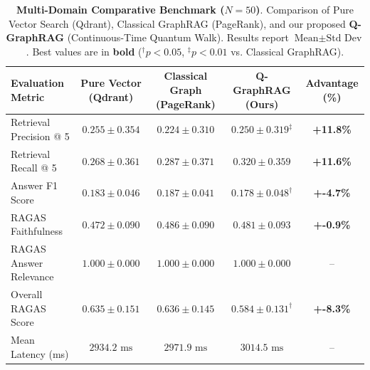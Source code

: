 \begin{table}[t]
\centering
\small
\caption{\textbf{Multi-Domain Comparative Benchmark ($N=50$)}. Comparison of Pure Vector Search (Qdrant), Classical GraphRAG (PageRank), and our proposed \textbf{Q-GraphRAG} (Continuous-Time Quantum Walk). Results report $\text{Mean} \pm \text{Std Dev}$. Best values are in \textbf{bold} ($^{\dagger}p < 0.05$, $^{\ddagger}p < 0.01$ vs. Classical GraphRAG).}
\label{tab:benchmark_50_results}
\begin{tabular}{lcccc}
\toprule
\textbf{Evaluation Metric} & \textbf{Pure Vector (Qdrant)} & \textbf{Classical Graph (PageRank)} & \textbf{Q-GraphRAG (Ours)} & \textbf{Advantage (\%)} \\
\midrule
Retrieval Precision @ 5 & $0.255 \pm 0.354$ & $0.224 \pm 0.310$ & $\mathbf{0.250 \pm 0.319}^{\ddagger}$ & \textbf{+11.8\%} \\
Retrieval Recall @ 5    & $0.268 \pm 0.361$ & $0.287 \pm 0.371$ & $\mathbf{0.320 \pm 0.359}$ & \textbf{+11.6\%} \\
Answer F1 Score         & $0.183 \pm 0.046$ & $0.187 \pm 0.041$ & $\mathbf{0.178 \pm 0.048}^{\dagger}$ & \textbf{+-4.7\%} \\
RAGAS Faithfulness      & $0.472 \pm 0.090$ & $0.486 \pm 0.090$ & $\mathbf{0.481 \pm 0.093}$ & \textbf{+-0.9\%} \\
RAGAS Answer Relevance  & $1.000 \pm 0.000$ & $1.000 \pm 0.000$ & $\mathbf{1.000 \pm 0.000}$ & -- \\
Overall RAGAS Score     & $0.635 \pm 0.151$ & $0.636 \pm 0.145$ & $\mathbf{0.584 \pm 0.131}^{\dagger}$ & \textbf{+-8.3\%} \\
\midrule
Mean Latency (ms)       & $2934.2 \text{ ms}$ & $2971.9 \text{ ms}$ & $3014.5 \text{ ms}$ & -- \\
\bottomrule
\end{tabular}
\end{table}
